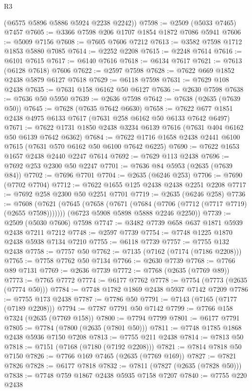 \begin{lexlean}{R3}
\begin{coremodule}
      (@6575 @5896 @5886 @5924 @2238 @2242))
@7598 := @2509 (@5033 @7465) @7457
@7605 := @3366 @7598 @206 @1707 @1854 @1872 @7086 @5941
@7606 := @5009 @7156
@7608 := @7605 @7606 @7212
@7613 := @3582 @7598 @1712 @1853 @5880 @7085
@7614 := @2252 @2208
@7615 := @2248 @7614
@7616 := @6101 @7615
@7617 := @6140 @7616
@7618 := @6134 @7617
@7621 := @7613 (@6128 @7618) @7606
@7622 := @2597 @7598
@7628 := @7622 @669 @1852 @2438 @5879 @6127 @7618
@7629 := @6118 @7598
@7631 := @7629 @108 @2438
@7635 := @7631 @158 @6162 @50 @6127
@7636 := @2630 @7598
@7638 := @7636 @50 @5950
@7639 := @2636 @7598
@7642 := @7638 (@2635 (@7639 @50))
@7645 := @7628 (@7635 @7642 @6630)
@7658 := @7622 @677 @1851 @2438 @4975 @6133 @7617 (@7631 @258 @6162 @50 @6133 @7642 @6497)
@7671 := @7622 @1731 @1850 @2438 @3234 @6139 @7616 (@7631 @404 @6162 @50 @6139 @7642 @6362)
@7684 := @7622 @1716 @1658 @2438 @2441 @6100 @7615 (@7631 @570 @6162 @50 @6100 @7642 @6225)
@7690 := @7622 @1653 @1657 @2438 @2440 @2247 @7614
@7692 := @7629 @113 @2438
@7696 := @7692 @253 @2300 @50 @2247
@7701 := @7636 @84 @5953 (@2635 (@7639 @84))
@7702 := @7696 @7701
@7704 := @2635 (@6246 @253)
@7706 := @7690 (@7702 @7704)
@7712 := @7622 @1655 @125 @2438 @2438 @2251 @2208
@7717 := @7692 @258 @2300 @50 @2251 @7701
@7719 := @2635 (@6246 @258)
@7736 := @7608
    (@7621
      (@7645 (@7658 (@7671 (@7684 (@7706 (@7712 (@7717 @7719) (@2655 @7598)))))))
      (@6723 @5908 @5898 @5888 @2246 @2250))
@7739 := @2509 (@5030 @7606) @7598
@7747 := @3482 @7739 @658 @637 @1871 @5939 @2438 @7211 @7212
@7748 := @2597 @7739
@7754 := @7748 @1225 @1870 @2438 @5938 @7134 @7210
@7755 := @6118 @7739
@7757 := @7755 @132 @2438
@7758 := @7757 @50
@7762 := @7135 (@7162 (@7174 (@7186 @2208)))
@7765 := @7758 @7762 @50 @7134
@7766 := @2630 @7739
@7768 := @7766 @89 @7131
@7769 := @2636 @7739
@7772 := @7768 (@2635 (@7769 @89))
@7773 := @7765 @7772
@7774 := @6177 @7762
@7778 := @7754 (@7773 (@2635 (@7774 @50)))
@7784 := @7748 @1782 @1869 @2438 @5937 @7142 @7209
@7786 := @7755 @173 @2438
@7787 := @7786 @50
@7791 := @7143 (@7165 (@7177 (@7189 @2208)))
@7794 := @7787 @7791 @50 @7142
@7799 := @7766 @158 @7324 (@2635 (@7769 @158))
@7800 := @7794 @7799
@7801 := @6177 @7791
@7805 := @7784 (@7800 (@2635 (@7801 @50)))
@7811 := @7748 @1785 @1868 @2438 @5936 @7150 @7208
@7813 := @7755 @211 @2438
@7814 := @7813 @50
@7818 := @7151 (@7168 (@7180 (@7192 @2208)))
@7821 := @7814 @7818 @50 @7150
@7826 := @7766 @169 @7465 (@2635 (@7769 @169))
@7827 := @7821 @7826
@7828 := @6177 @7818
@7832 := @7811 (@7827 (@2635 (@7828 @50)))
@7838 := @7748 @759 @1867 @2438 @5935 @7158 @7207
@7840 := @7755 @220 @2438

\end{coremodule}
\end{lexlean}
